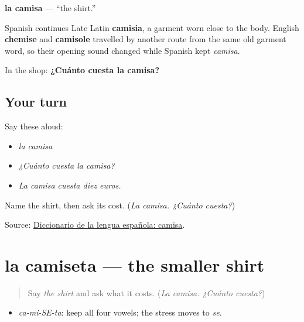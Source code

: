 \begin{cousinweb}
\textbf{la camisa} — \textquotedblleft{}the shirt.\textquotedblright{}

Spanish continues Late Latin \textbf{camisia}, a garment worn close to the body. English \textbf{chemise} and \textbf{camisole} travelled by another route from the same old garment word, so their opening sound changed while Spanish kept \emph{camisa}.

In the shop: \textbf{¿Cuánto cuesta la camisa?}
\end{cousinweb}

\subsection*{Your turn}
Say these aloud:

\begin{itemize}
\raggedright
  \item \emph{la camisa}
  \item \emph{¿Cuánto cuesta la camisa?}
  \item \emph{La camisa cuesta diez euros.}
\end{itemize}

\begin{tcolorbox}[breakable,colback=teal!4,colframe=teal!35!black,title={Before you move on}]
Name the shirt, then ask its cost. (\emph{La camisa. ¿Cuánto cuesta?})

Source: \href{https://dle.rae.es/camisa}{Diccionario de la lengua española: camisa}.
\end{tcolorbox}
\section[la camiseta]{la camiseta — the smaller shirt}

\label{lesson:ES-C402-camiseta}



\begin{quote}
Say \emph{the shirt} and ask what it costs. (\emph{La camisa. ¿Cuánto cuesta?})
\end{quote}

\begin{sounds}
\begin{itemize}
\raggedright
  \item \emph{ca-mi-SE-ta}: keep all four vowels; the stress moves to \emph{se}.
\end{itemize}
\end{sounds}

